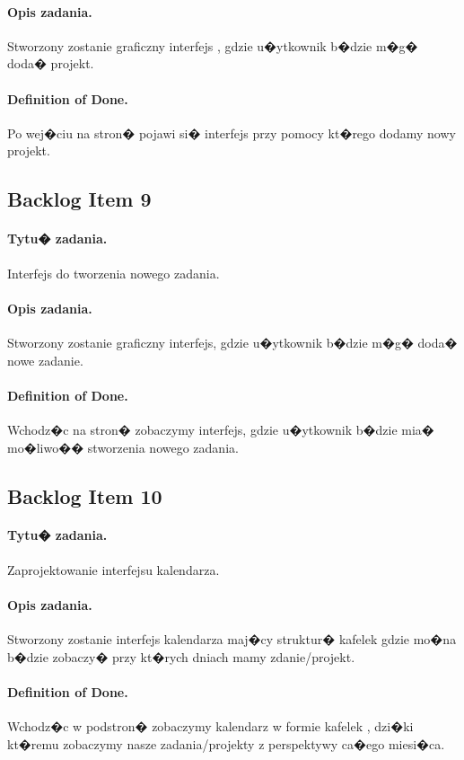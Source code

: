 ﻿\documentclass[a4paper]{article}
\begin{document}
\paragraph{Opis zadania.} Stworzony zostanie graficzny interfejs , gdzie u�ytkownik b�dzie m�g� doda� projekt.
\paragraph{Definition of Done.} Po wej�ciu na stron� pojawi si� interfejs przy pomocy kt�rego dodamy nowy projekt.

\subsection{Backlog Item 9} 
\paragraph{Tytu� zadania.} Interfejs do tworzenia nowego zadania.
\paragraph{Opis zadania.} Stworzony zostanie graficzny interfejs, gdzie u�ytkownik b�dzie m�g� doda� nowe zadanie.
\paragraph{Definition of Done.} Wchodz�c na stron� zobaczymy interfejs, gdzie u�ytkownik b�dzie mia� mo�liwo�� stworzenia nowego zadania.

\subsection{Backlog Item 10} 
\paragraph{Tytu� zadania.} Zaprojektowanie interfejsu kalendarza.
\paragraph{Opis zadania.} Stworzony zostanie interfejs kalendarza maj�cy struktur� kafelek gdzie mo�na b�dzie zobaczy� przy kt�rych dniach mamy zdanie/projekt.
\paragraph{Definition of Done.} Wchodz�c w podstron� zobaczymy kalendarz w formie kafelek , dzi�ki kt�remu zobaczymy nasze zadania/projekty z perspektywy ca�ego miesi�ca.
\end{document}
